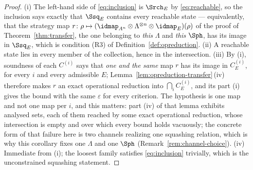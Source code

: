 \begin{proof}
(i) The left-hand side of \eqref{eq:inclusion} is $\Srch_E$ by
\eqref{eq:reachable}, so the inclusion says exactly that $\Ssq_E$ contains
every reachable state --- equivalently, that the strategy map
$r\colon\rho\mapsto(\idmap_{A^{n}}\otimes\Lambda^{\otimes n}\otimes
\idmap_E)(\rho)$ of the proof of Theorem~\ref{thm:transfer}, the one belonging
to \emph{this} $\Lambda$ and \emph{this} $\Sph$, has its image in $\Ssq_E$,
which is condition (R3) of Definition~\ref{def:opreduction}. (ii) A reachable
state lies in every member of the collection, hence in the intersection.
(iii) By (i), soundness of each $C^{(i)}$ says that \emph{one and the same}
map $r$ has its image in $C^{(i)}_E$, for every $i$ and every admissible $E$;
Lemma~\ref{lem:opreduction-transfer}\,(iv) therefore makes $r$ an exact
operational reduction into $\bigcap_iC^{(i)}_E$, and its part (i) gives the
bound with the same $\varepsilon$ for every criterion. The hypothesis is one
map and not one map per $i$, and this matters: part (iv) of that lemma
exhibits analysed sets, each of them reached by some exact operational
reduction, whose intersection is empty and over which every bound holds
vacuously; the concrete form of that failure here is two channels realizing
one squashing relation, which is why this corollary fixes one $\Lambda$ and
one $\Sph$ (Remark~\ref{rem:channel-choice}). (iv) Immediate from (i); the
loosest family satisfies \eqref{eq:inclusion} trivially, which is the
unconstrained squashing statement.
\end{proof}
